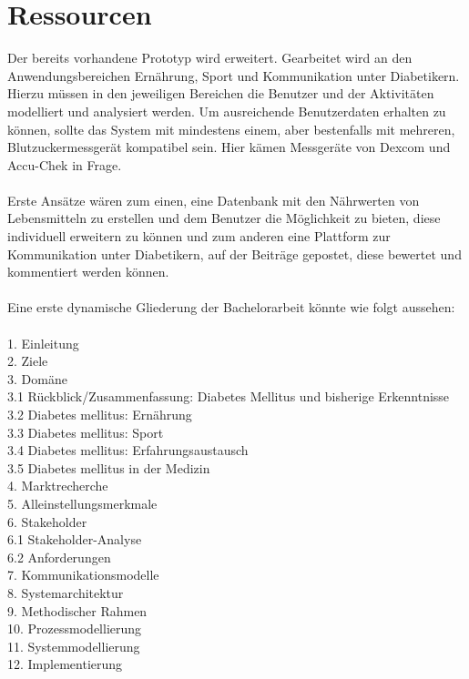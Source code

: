 \documentclass[a4paper, 12pt]{scrartcl}
\begin{document}
			\section{Ressourcen}
				Der bereits vorhandene Prototyp wird erweitert. Gearbeitet wird an den Anwendungsbereichen Ernährung, Sport und Kommunikation unter Diabetikern. Hierzu müssen in den jeweiligen Bereichen die Benutzer und der Aktivitäten modelliert und analysiert werden. Um ausreichende Benutzerdaten erhalten zu können, sollte das System mit mindestens einem, aber bestenfalls mit mehreren, Blutzuckermessgerät kompatibel sein. Hier kämen Messgeräte von Dexcom und Accu-Chek in Frage.\\
\\
				Erste Ansätze wären zum einen, eine Datenbank mit den Nährwerten von Lebensmitteln zu erstellen und dem Benutzer die Möglichkeit zu bieten, diese individuell erweitern zu können und zum anderen eine Plattform zur Kommunikation unter Diabetikern, auf der Beiträge gepostet, diese bewertet und kommentiert werden können.\\
				\\
				Eine erste dynamische Gliederung der Bachelorarbeit könnte wie folgt aussehen:\\\\
				1.	Einleitung\\
				2.	Ziele\\
				3.	Domäne\\
				3.1	Rückblick/Zusammenfassung: Diabetes Mellitus und bisherige Erkenntnisse\\
				3.2	Diabetes mellitus: Ernährung\\
				3.3	Diabetes mellitus: Sport\\
				3.4	Diabetes mellitus: Erfahrungsaustausch\\
				3.5	Diabetes mellitus in der Medizin\\
				4.	Marktrecherche\\
				5.	Alleinstellungsmerkmale\\
				6.	Stakeholder\\
				6.1	Stakeholder-Analyse\\
				6.2	Anforderungen\\
				7.	Kommunikationsmodelle\\
				8.	Systemarchitektur\\
				9.	Methodischer Rahmen\\
				10.	Prozessmodellierung\\
				11.	Systemmodellierung\\
				12.	Implementierung\\
\end{document}
